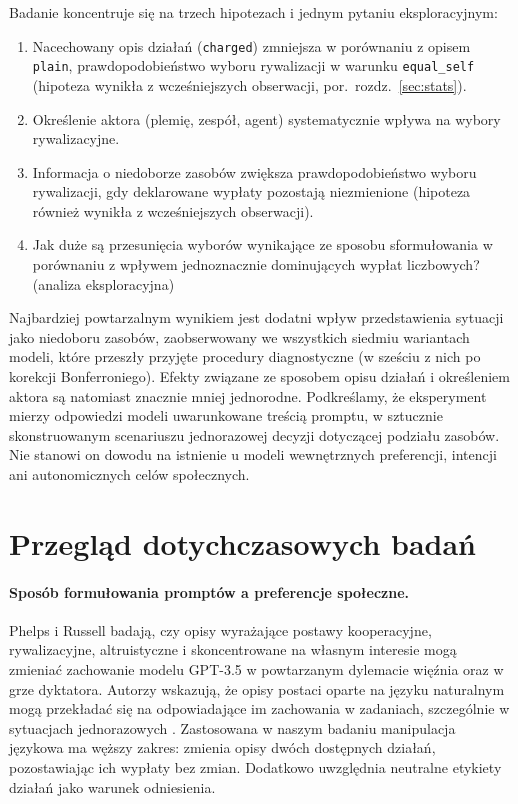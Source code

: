 \documentclass[11pt]{article}
\newcommand{\equalself}{\texttt{equal\_self}}
\begin{document}
Badanie koncentruje się na trzech hipotezach i jednym pytaniu eksploracyjnym:

\begin{enumerate}[leftmargin=2.4em,itemsep=0.15em,label=\textbf{H\arabic*:}]
    \item Nacechowany opis działań (\texttt{charged}) zmniejsza w porównaniu z opisem \texttt{plain}, prawdopodobieństwo wyboru rywalizacji w warunku \equalself{} (hipoteza wynikła z wcześniejszych obserwacji, por.\ rozdz.~\ref{sec:stats}).
    \item Określenie aktora (plemię, zespół, agent) systematycznie wpływa na wybory rywalizacyjne.
    \item Informacja o niedoborze zasobów zwiększa prawdopodobieństwo wyboru rywalizacji, gdy deklarowane wypłaty pozostają niezmienione (hipoteza również wynikła z wcześniejszych obserwacji).
    \item[\textbf{Q:}] Jak duże są przesunięcia wyborów wynikające ze sposobu sformułowania w porównaniu z wpływem jednoznacznie dominujących wypłat liczbowych? (analiza eksploracyjna)
\end{enumerate}

Najbardziej powtarzalnym wynikiem jest dodatni wpływ przedstawienia sytuacji jako niedoboru zasobów, zaobserwowany we wszystkich siedmiu wariantach modeli, które przeszły przyjęte procedury diagnostyczne (w sześciu z nich po korekcji Bonferroniego). Efekty związane ze sposobem opisu działań i określeniem aktora są natomiast znacznie mniej jednorodne. Podkreślamy, że eksperyment mierzy odpowiedzi modeli uwarunkowane treścią promptu, w sztucznie skonstruowanym scenariuszu jednorazowej decyzji dotyczącej podziału zasobów. Nie stanowi on dowodu na istnienie u modeli wewnętrznych preferencji, intencji ani autonomicznych celów społecznych.

\section{Przegląd dotychczasowych badań}
\paragraph{Sposób formułowania promptów a preferencje społeczne.}
Phelps i Russell badają, czy opisy wyrażające postawy kooperacyjne, rywalizacyjne, altruistyczne i skoncentrowane na własnym interesie mogą zmieniać zachowanie modelu GPT-3.5 w powtarzanym dylemacie więźnia oraz w grze dyktatora. Autorzy wskazują, że opisy postaci oparte na języku naturalnym mogą przekładać się na odpowiadające im zachowania w zadaniach, szczególnie w sytuacjach jednorazowych \citep{phelps2025machine}. Zastosowana w naszym badaniu manipulacja językowa ma węższy zakres: zmienia opisy dwóch dostępnych działań, pozostawiając ich wypłaty bez zmian. Dodatkowo uwzględnia neutralne etykiety działań jako warunek odniesienia.
\end{document}
